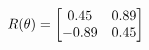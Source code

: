 \documentclass[preview]{standalone}
\begin{document}
\begin{align*}
\special{dvisvgm:raw <g id='unique000'>}R(\theta) = \begin{bmatrix}0.45 & 0.89\\-0.89 & 0.45\end{bmatrix}\special{dvisvgm:raw </g>}
\end{align*}
\end{document}
